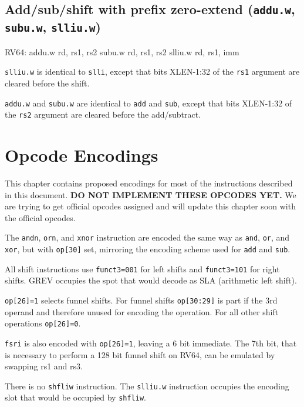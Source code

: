 \subsection{Add/sub/shift with prefix zero-extend ({\tt addu.w}, {\tt subu.w}, {\tt slliu.w})}

\begin{rvb}
  RV64:
    addu.w rd, rs1, rs2
    subu.w rd, rs1, rs2
    slliu.w rd, rs1, imm
\end{rvb}

{\tt slliu.w} is identical to {\tt slli}, except that bits XLEN-1:32 of the
{\tt rs1} argument are cleared before the shift.

{\tt addu.w} and {\tt subu.w} are identical to {\tt add} and {\tt sub}, except
that bits XLEN-1:32 of the {\tt rs2} argument are cleared before the add/subtract.





\section{Opcode Encodings}
\label{opcodes}

This chapter contains proposed encodings for most of the instructions described
in this document. {\bf DO NOT IMPLEMENT THESE OPCODES YET.} We are trying to get
official opcodes assigned and will update this chapter soon with the official
opcodes.

The {\tt andn}, {\tt orn}, and {\tt xnor} instruction are encoded the same way
as {\tt and}, {\tt or}, and {\tt xor}, but with {\tt op[30]} set, mirroring the
encoding scheme used for {\tt add} and {\tt sub}.

All shift instructions use {\tt funct3=001} for left shifts and {\tt funct3=101}
for right shifts. GREV occupies the spot that would decode as SLA (arithmetic
left shift).

{\tt op[26]=1} selects funnel shifts. For funnel shifts {\tt op[30:29]} is part
if the 3rd operand and therefore unused for encoding the operation. For all other
shift operations {\tt op[26]=0}.

{\tt fsri} is also encoded with {\tt op[26]=1}, leaving a 6 bit immediate. The 7th
bit, that is necessary to perform a 128 bit funnel shift on RV64, can be
emulated by swapping rs1 and rs3.

There is no {\tt shfliw} instruction. The {\tt slliu.w} instruction occupies
the encoding slot that would be occupied by {\tt shfliw}.

